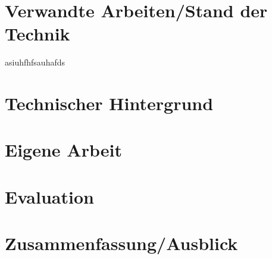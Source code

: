 \documentclass{llncs}
\begin{document}
\section{Verwandte Arbeiten/Stand der Technik}

asiuhfhfsauhafds
\section{Technischer Hintergrund} \section{Eigene Arbeit} \section{Evaluation} \section{Zusammenfassung/Ausblick}

\end{document}
